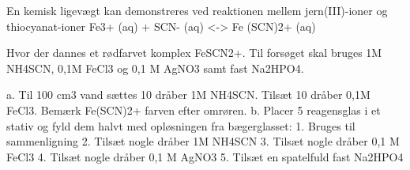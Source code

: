 
\danskkemi{}

En kemisk ligevægt kan demonstreres ved reaktionen mellem jern(III)-ioner
og thiocyanat-ioner
Fe3+ (aq) + SCN- (aq) <-> Fe (SCN)2+ (aq)

Hvor der dannes et rødfarvet komplex FeSCN2+.
Til forsøget skal bruges 1M NH4SCN, 0,1M FeCl3 og 0,1 M AgNO3 samt fast
Na2HPO4.

a. Til 100 cm3 vand sættes 10 dråber 1M NH4SCN. Tilsæt 10 dråber 0,1M FeCl3.
Bemærk Fe(SCN)2+ farven efter omrøren.
b. Placer 5 reagensglas i et stativ og fyld dem halvt med opløsningen fra bægerglasset:
1. Bruges til sammenligning
2. Tilsæt nogle dråber 1M NH4SCN
3. Tilsæt nogle dråber 0,1 M FeCl3
4. Tilsæt nogle dråber 0,1 M AgNO3
5. Tilsæt en spatelfuld fast Na2HPO4
